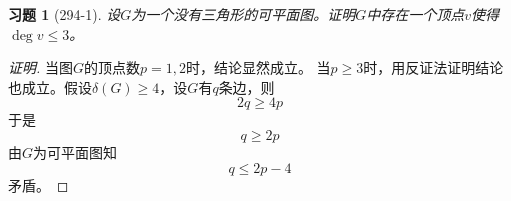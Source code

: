 \documentclass{article}
\begin{document}
\begin{CJK}{UTF8}{gbsn}
  \newtheorem*{Exercise}{习题}
\begin{Exercise}[294-1]
  设$G$为一个没有三角形的可平面图。证明$G$中存在一个顶点$v$使得$\deg v \leq 3$。
\end{Exercise}
\begin{proof}[证明]
  当图$G$的顶点数$p=1,2$时，结论显然成立。
  当$p \geq 3$时，用反证法证明结论也成立。假设$\delta (G) \geq 4$，设$G$有$q$条边，则
  \[2q \geq 4p\]
  于是\[q \geq 2p\]
  由$G$为可平面图知
  \[q \leq 2p - 4\]
矛盾。  
\end{proof}

\end{CJK}
\end{document}
